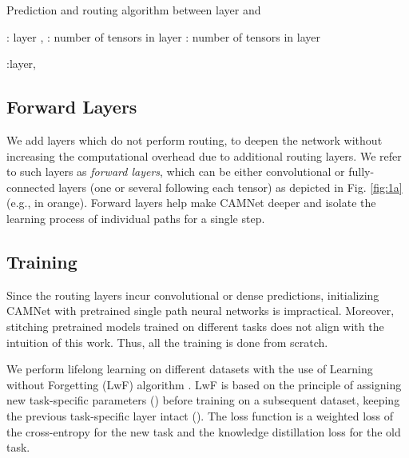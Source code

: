 \documentclass[10pt,twocolumn,letterpaper]{article}
\newlength\myindent
\newcommand\bindent{\begingroup
	\setlength{\itemindent}{\myindent}
	\addtolength{\algorithmicindent}{\myindent}
}
\newcommand\eindent{\endgroup}
\begin{document}
\begin{algorithm}[ht]
	\caption{Prediction and routing algorithm between layer  and }
	\label{alg:routing}
	\begin{algorithmic}
		\bindent
		\STATE : layer , \COMMENT{ = [ for ]}
		\STATE : number of tensors in layer  
		\STATE : number of tensors in layer   
		\eindent
		
		\bindent
		\STATE  
		\ENDFOR
		\STATE  
		\ENDFOR	
		\eindent	
		
		\bindent
		\STATE 
		\ENDFOR
		\eindent	
		
		\bindent
		\STATE :layer,
		\COMMENT{=[ for ]}
		\eindent
	\end{algorithmic}	
\end{algorithm}



\subsection{Forward Layers}
\label{ss:sa_forw_layers}
\vspace{-0.05in}
We add layers which do not perform routing, to deepen the network without increasing the computational overhead due to additional routing layers. We refer to such layers as \textit{forward layers}, which can be either convolutional or fully-connected layers (one or several following each tensor) as depicted in Fig. \ref{fig:1a} (e.g.,  in orange). Forward layers help make CAMNet deeper and isolate the learning process of individual paths for a single step.

\subsection{Training}
\label{ss:sa_training}
\vspace{-0.05in}
Since the routing layers incur convolutional or dense predictions, initializing CAMNet with pretrained single path neural networks is impractical. Moreover, stitching pretrained models trained on different tasks does not align with the intuition of this work. Thus, all the training is done from scratch. 


We perform lifelong learning on different datasets with the use of Learning without Forgetting (LwF) algorithm \cite{li2018learning}. LwF is based on the principle of assigning new task-specific parameters () before training on a subsequent dataset, keeping the previous task-specific layer intact (). The loss function is a weighted loss of the cross-entropy for the new task and the knowledge distillation loss \cite{hinton2015distilling} for the old task.
\end{document}
